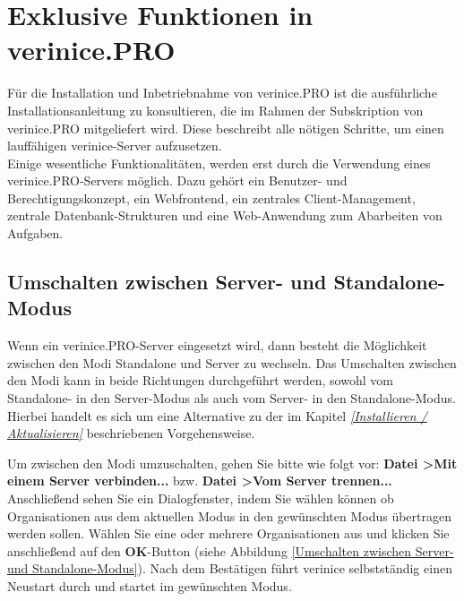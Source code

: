\documentclass[a4paper,10pt]{book}
\begin{document}
\chapter{Exklusive Funktionen in verinice.PRO}
Für die Installation und Inbetriebnahme von verinice.\textsc{PRO} ist die ausführliche Installationsanleitung zu konsultieren, die im Rahmen
der Subskription von verinice.\textsc{PRO} mitgeliefert wird. Diese beschreibt alle nötigen Schritte, um einen lauffähigen verinice-Server aufzusetzen.
\newline\\
Einige wesentliche Funktionalitäten, werden erst durch die Verwendung eines verinice.\textsc{PRO}-Servers möglich. Dazu gehört ein Benutzer- und
Berechtigungskonzept, ein Webfrontend, ein zentrales Client-Management, zentrale Datenbank-Strukturen und eine Web-Anwendung zum Abarbeiten von Aufgaben.

\section{Umschalten zwischen Server- und Standalone-Modus}
Wenn ein verinice.\textsc{PRO}-Server eingesetzt wird, dann besteht die Möglichkeit zwischen den Modi Standalone und Server zu wechseln.
Das Umschalten zwischen den Modi kann in beide Richtungen durchgeführt werden, sowohl vom Standalone- in den Server-Modus als auch vom Server- in den Standalone-Modus.
Hierbei handelt es sich um eine Alternative zu der im Kapitel {\em \ref{Installieren / Aktualisieren} } beschriebenen Vorgehensweise.

Um zwischen den Modi umzuschalten, gehen Sie bitte wie folgt vor: \textbf{Datei \textgreater Mit einem Server verbinden...} bzw. \textbf{Datei \textgreater Vom Server trennen...}
Anschließend sehen Sie ein Dialogfenster, indem Sie wählen können ob Organisationen aus dem aktuellen Modus in den gewünschten Modus übertragen werden sollen.
Wählen Sie eine oder mehrere Organisationen aus und klicken Sie anschließend auf den \textbf{OK}-Button (siehe Abbildung \ref{Umschalten zwischen Server- und Standalone-Modus}).
Nach dem Bestätigen führt verinice selbstständig einen Neustart durch und startet im gewünschten Modus.
\end{document}
